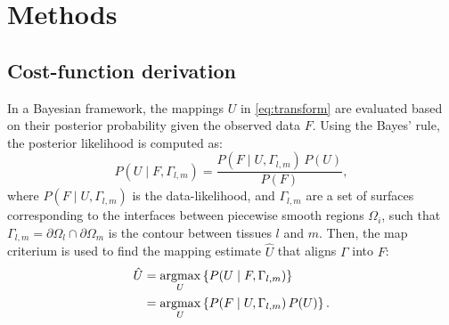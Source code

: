 \section{Methods}
\label{sec:methods}
%

\subsection{Cost-function derivation}
\label{sec:methods_map}

In a Bayesian framework, the mappings $U$ in \autoref{eq:transform} are
  evaluated based on their posterior probability given the observed data
  $F$.
Using the Bayes' rule, the posterior likelihood is computed as:
  \begin{equation}
  P(U \mid F,\Gamma_{l,m}) = \frac{P(F \mid U,\Gamma_{l,m})\, P(U)}{P(F)},
  \label{eq:bayes_rule}
  \end{equation}
  where $P(F \mid U,\Gamma_{l,m})$ is the data-likelihood, and
  $\Gamma_{l,m}$ are a set of surfaces corresponding to the interfaces
  between piecewise smooth regions $\Omega_i$, such that
  $\Gamma_{l,m} = \partial \Omega_l \cap \partial \Omega_m$ is the
  contour between tissues $l$ and $m$.
Then, the \gls*{map} criterium \citep{leemput_automated_1999} is used
  to find the mapping estimate $\hat{U}$ that aligns $\Gamma$ into $F$:
  \begin{align}
  \hat{U} &= \underset{U}{\argmax} \left\{ P(U \mid F,\Gamma_{l,m}) \right\} \notag\\
   &= \underset{U}{\argmax} \left\{ P(F \mid U,\Gamma_{l,m})\, P(U) \right\}.
  \label{eq:map_u}
  \end{align}

